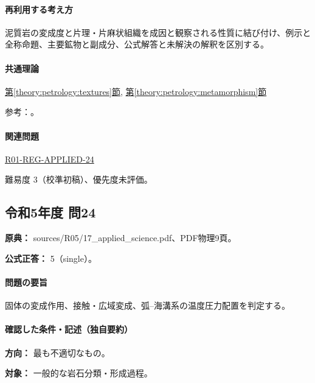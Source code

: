 \paragraph{再利用する考え方} 泥質岩の変成度と片理・片麻状組織を成因と観察される性質に結び付け、例示と全称命題、主要鉱物と副成分、公式解答と未解決の解釈を区別する。

\paragraph{共通理論} \hyperref[theory:petrology:textures]{第\ref*{theory:petrology:textures}節}, \hyperref[theory:petrology:metamorphism]{第\ref*{theory:petrology:metamorphism}節}

\par 参考：\cite{gsj_metamorphic_words,nelson_regional2011}。

\paragraph{関連問題} \hyperref[q:r01-reg-applied-24]{R01-REG-APPLIED-24}

\par 難易度 3（校準初稿）、優先度未評価。

\subsection{令和5年度 問24}
\label{q:r05-reg-applied-24}

\noindent\textbf{原典：} sources/R05/17\_applied\_science.pdf、PDF物理9頁。

\textbf{公式正答：} 5（single）。

\paragraph{問題の要旨} 固体の変成作用、接触・広域変成、弧–海溝系の温度圧力配置を判定する。

\paragraph{確認した条件・記述（独自要約）}\mbox{}\par

\noindent\textbf{方向：} 最も不適切なもの。\par

\noindent\textbf{対象：} 一般的な岩石分類・形成過程。\par

